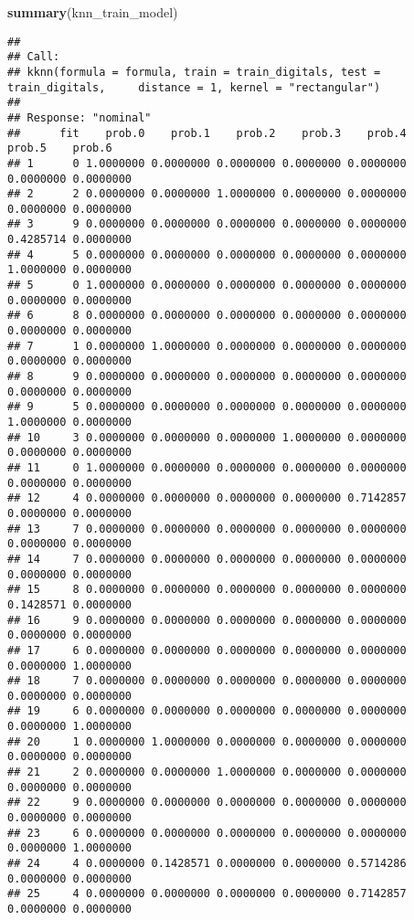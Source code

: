 \documentclass[
]{article}
\newenvironment{Shaded}{\begin{snugshade}}{\end{snugshade}}
\newcommand{\FunctionTok}[1]{\textcolor[rgb]{0.13,0.29,0.53}{\textbf{#1}}}
\newcommand{\NormalTok}[1]{#1}
\begin{document}
\begin{Shaded}
\begin{Highlighting}[]
\FunctionTok{summary}\NormalTok{(knn\_train\_model)}
\end{Highlighting}
\end{Shaded}

\begin{verbatim}
## 
## Call:
## kknn(formula = formula, train = train_digitals, test = train_digitals,     distance = 1, kernel = "rectangular")
## 
## Response: "nominal"
##      fit    prob.0    prob.1    prob.2    prob.3    prob.4    prob.5    prob.6
## 1      0 1.0000000 0.0000000 0.0000000 0.0000000 0.0000000 0.0000000 0.0000000
## 2      2 0.0000000 0.0000000 1.0000000 0.0000000 0.0000000 0.0000000 0.0000000
## 3      9 0.0000000 0.0000000 0.0000000 0.0000000 0.0000000 0.4285714 0.0000000
## 4      5 0.0000000 0.0000000 0.0000000 0.0000000 0.0000000 1.0000000 0.0000000
## 5      0 1.0000000 0.0000000 0.0000000 0.0000000 0.0000000 0.0000000 0.0000000
## 6      8 0.0000000 0.0000000 0.0000000 0.0000000 0.0000000 0.0000000 0.0000000
## 7      1 0.0000000 1.0000000 0.0000000 0.0000000 0.0000000 0.0000000 0.0000000
## 8      9 0.0000000 0.0000000 0.0000000 0.0000000 0.0000000 0.0000000 0.0000000
## 9      5 0.0000000 0.0000000 0.0000000 0.0000000 0.0000000 1.0000000 0.0000000
## 10     3 0.0000000 0.0000000 0.0000000 1.0000000 0.0000000 0.0000000 0.0000000
## 11     0 1.0000000 0.0000000 0.0000000 0.0000000 0.0000000 0.0000000 0.0000000
## 12     4 0.0000000 0.0000000 0.0000000 0.0000000 0.7142857 0.0000000 0.0000000
## 13     7 0.0000000 0.0000000 0.0000000 0.0000000 0.0000000 0.0000000 0.0000000
## 14     7 0.0000000 0.0000000 0.0000000 0.0000000 0.0000000 0.0000000 0.0000000
## 15     8 0.0000000 0.0000000 0.0000000 0.0000000 0.0000000 0.1428571 0.0000000
## 16     9 0.0000000 0.0000000 0.0000000 0.0000000 0.0000000 0.0000000 0.0000000
## 17     6 0.0000000 0.0000000 0.0000000 0.0000000 0.0000000 0.0000000 1.0000000
## 18     7 0.0000000 0.0000000 0.0000000 0.0000000 0.0000000 0.0000000 0.0000000
## 19     6 0.0000000 0.0000000 0.0000000 0.0000000 0.0000000 0.0000000 1.0000000
## 20     1 0.0000000 1.0000000 0.0000000 0.0000000 0.0000000 0.0000000 0.0000000
## 21     2 0.0000000 0.0000000 1.0000000 0.0000000 0.0000000 0.0000000 0.0000000
## 22     9 0.0000000 0.0000000 0.0000000 0.0000000 0.0000000 0.0000000 0.0000000
## 23     6 0.0000000 0.0000000 0.0000000 0.0000000 0.0000000 0.0000000 1.0000000
## 24     4 0.0000000 0.1428571 0.0000000 0.0000000 0.5714286 0.0000000 0.0000000
## 25     4 0.0000000 0.0000000 0.0000000 0.0000000 0.7142857 0.0000000 0.0000000

\end{verbatim}
\end{document}

